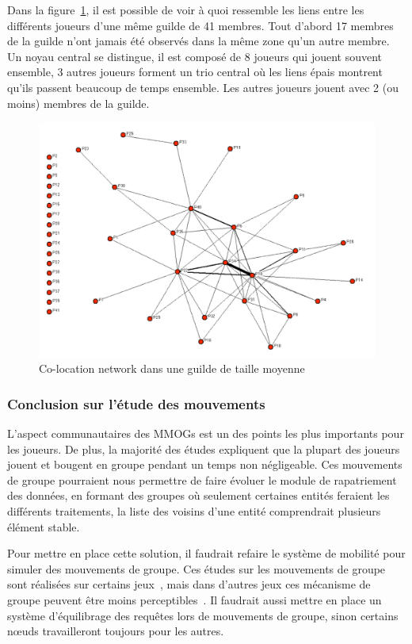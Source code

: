 \par Dans la figure~\ref{co-location}, il est possible de voir à quoi ressemble les liens entre les différents joueurs d'une même guilde de 41 membres. Tout d'abord 17 membres de la guilde n'ont jamais été observés dans la même zone qu'un autre membre. Un noyau central se distingue, il est composé de 8 joueurs qui jouent souvent ensemble, 3 autres joueurs forment un trio central où les liens épais montrent qu'ils passent beaucoup de temps ensemble. Les autres joueurs jouent avec 2 (ou moins) membres de la guilde.
	 \begin{figure}[!h]
        \centering
        \includegraphics[scale=0.75]{./Ressources/Images/co-location.png}
        \caption{Co-location network dans une guilde de taille moyenne}
        \label{co-location}
        \end{figure}

\subsubsection{Conclusion sur l'étude des mouvements}
L'aspect communautaires des MMOGs est un des points les plus importants pour les joueurs. De plus, la majorité des études expliquent que la plupart des joueurs jouent et bougent en groupe pendant un temps non négligeable. Ces mouvements de groupe pourraient nous permettre de faire évoluer le module de rapatriement des données, en formant des groupes où seulement certaines entités feraient les différents traitements, la liste des voisins d'une entité comprendrait plusieurs élément stable.
\par Pour mettre en place cette solution, il faudrait refaire le système de mobilité pour simuler des mouvements de groupe. Ces études sur les mouvements de groupe sont réalisées sur certains jeux~\cite{wow,everquest}, mais dans d'autres jeux ces mécanisme de groupe peuvent être moins perceptibles~\cite{sl}. Il faudrait aussi mettre en place un système d'équilibrage des requêtes lors de mouvements de groupe, sinon certains nœuds travailleront toujours pour les autres.


